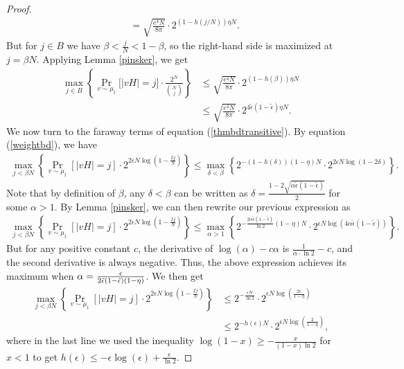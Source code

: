 \documentclass[12pt]{article}
\begin{document}
\begin{proof}
\begin{align*}
    &= \sqrt{\frac{e^4 N}{8\pi}}\cdot 2^{(1-h(j/N))\eta N}.
\end{align*}
But for $j\in B$ we have $\beta<\frac{j}{N}<1-\beta$, so the right-hand side is maximized at $j=\beta N$. Applying Lemma \ref{pinsker}, we get
\begin{align}\label{centraltermstransitive}
    \max_{j\in B}\left\{\Pr_{v\sim\mu_t}\big[|vH|=j \big]\cdot \frac{2^N}{\binom{N}{j}}\right\}  &\leq \sqrt{\frac{e^4 N}{8\pi}}\cdot 2^{(1-h(\beta))\eta N} \nonumber\\
    &\leq \sqrt{\frac{e^4 N}{8\pi}}\cdot 2^{4\tilde{\epsilon}(1-\tilde{\epsilon})\eta N}.
\end{align}
We now turn to the faraway terms of equation (\ref{thmbdtransitive}). By equation (\ref{weightbd}), we have 
\begin{align*}
    \max_{ j<\beta N}\left\{ \Pr_{v\sim \mu_t}[|v H|=j]\cdot 2^{2\epsilon N\log(1-\frac{2j}{N})} \right\}\leq\max_{ \delta< \beta}\left\{  2^{-(1-h(\delta))(1-\eta) N}\cdot 2^{2\epsilon N\log(1-2\delta)} \right\}.
\end{align*}
Note that by definition of $\beta$, any $\delta<\beta$ can be written as $\delta=\frac{1-2\sqrt{\alpha\tilde{\epsilon}(1-\tilde{\epsilon})}}{2}$ for some $\alpha> 1$. By Lemma \ref{pinsker}, we can then rewrite our previous expression as
\begin{align*}
    \max_{ j<\beta N}\left\{ \Pr_{v\sim \mu_t}[|v H|=j]\cdot 2^{2\epsilon N\log(1-\frac{2j}{N})} \right\}\leq\max_{ \alpha> 1}\left\{  2^{-\frac{2\alpha\tilde{\epsilon}(1-\tilde{\epsilon})}{\ln2}(1-\eta) N}\cdot 2^{\epsilon N\log(4\alpha\tilde{\epsilon}(1-\tilde{\epsilon}))} \right\}.
\end{align*}
But for any positive constant $c$, the derivative of $\log (\alpha) - c \alpha$ is $\frac{1}{\alpha\cdot\ln2} - c$, and the second derivative is always negative. Thus, the above expression achieves its maximum when $\alpha = \frac{\epsilon }{2\Tilde{\epsilon}(1-\Tilde{\epsilon})(1-\eta)}$. We then get
\begin{align}\label{farawayterms}
    \max_{ j<\beta N}\left\{ \Pr_{v\sim \mu_t}[|v H|=j]\cdot 2^{2\epsilon N\log(1-\frac{2j}{N})} \right\}&\leq  2^{-\frac{\epsilon N}{\ln2}}\cdot 2^{\epsilon N\log(\frac{2\epsilon}{1-\eta})}\nonumber\\
    &\leq  2^{-h(\epsilon)N}\cdot
    2^{\epsilon N\log(\frac{2}{1-\eta})},
\end{align}
where in the last line we used the inequality $\log(1-x)\geq -\frac{x}{(1-x)\ln2}$ for $x<1$ to get $h(\epsilon)\leq -\epsilon\log(\epsilon)+\frac{\epsilon}{\ln2}$.

\end{proof}
\end{document}
